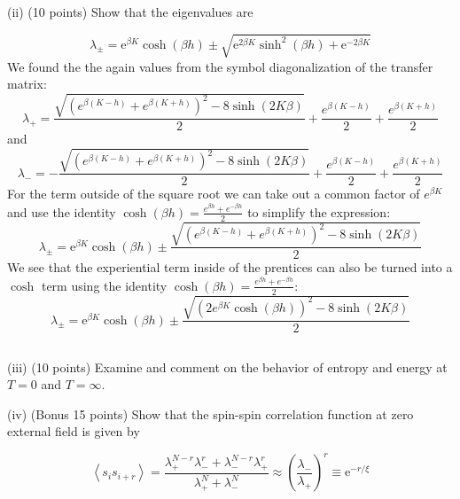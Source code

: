 \documentclass[12pt]{article}
\begin{document}
\subsection{}

(ii) (10 points) Show that the eigenvalues are


\begin{equation*}
\lambda_{ \pm}=\mathrm{e}^{\beta K} \cosh (\beta h) \pm \sqrt{\mathrm{e}^{2 \beta K} \sinh ^{2}(\beta h)+\mathrm{e}^{-2 \beta K}} \tag{6}
\end{equation*}
We found the the again values from the symbol diagonalization of the transfer matrix:
\begin{equation}
  \lambda_{+} = \frac{\sqrt{\left(e^{\beta(K - h)} + e^{\beta(K + h)}\right)^2 - 8\sinh(2K\beta)}}{2} + \frac{e^{\beta(K - h)}}{2} + \frac{e^{\beta(K + h)}}{2}
\end{equation}
and
\begin{equation}
  \lambda_{-} = -\frac{\sqrt{\left(e^{\beta(K - h)} + e^{\beta(K + h)}\right)^2 - 8\sinh(2K\beta)}}{2} + \frac{e^{\beta(K - h)}}{2} + \frac{e^{\beta(K + h)}}{2}
\end{equation}
For the term outside of the square root we can take out a common factor of $e^{\beta K}$ and use the identity $\cosh(\beta h) = \frac{e^{\beta h} + e^{-\beta h}}{2}$ to simplify the expression:
\begin{equation}
\lambda_{ \pm}=\mathrm{e}^{\beta K} \cosh (\beta h) \pm \frac{\sqrt{\left(e^{\beta(K - h)} + e^{\beta(K + h)}\right)^2 - 8\sinh(2K\beta)}}{2}
\end{equation}
We see that the experiential term inside of the prentices can also be turned into a $\cosh$ term using the identity $\cosh (\beta h) = \frac{e^{\beta h} + e^{-\beta h}}{2}$:
\begin{equation}
\lambda_{ \pm}=\mathrm{e}^{\beta K} \cosh (\beta h) \pm\frac{\sqrt{\left( 2e^{\beta K} \cosh (\beta h) \right)^2 - 8\sinh(2K\beta)}}{2}
\end{equation}
\subsection{}
(iii) (10 points) Examine and comment on the behavior of entropy and energy at $T=0$ and $T=\infty$.

(iv) (Bonus 15 points) Show that the spin-spin correlation function at zero external field is given by


\begin{equation*}
\left\langle s_{i} s_{i+r}\right\rangle=\frac{\lambda_{+}^{N-r} \lambda_{-}^{r}+\lambda_{-}^{N-r} \lambda_{+}^{r}}{\lambda_{+}^{N}+\lambda_{-}^{N}} \approx\left(\frac{\lambda_{-}}{\lambda_{+}}\right)^{r} \equiv \mathrm{e}^{-r / \xi} \tag{7}
\end{equation*}
\end{document}
